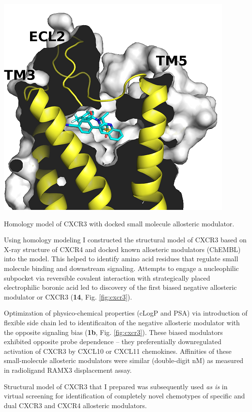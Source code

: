\documentclass{tufte-handout}
\begin{document}
\begin{marginfigure}\label{fig:cxcrHM}
	\includegraphics{cxcr3hpp_small.png}
	\caption{Homology model of CXCR3 with docked small molecule allosteric modulator.}
\end{marginfigure}
 Using homology modeling 
I constructed the structural model of CXCR3 based on X-ray structure of CXCR4 and
docked known allosteric modulators (ChEMBL) into the model. This helped to identify amino acid 
residues that regulate small molecule binding and downstream signaling. Attempts to engage 
a nucleophilic subpocket via reversible covalent interaction with strategically placed electrophilic boronic acid led
to discovery of the first biased negative allosteric modulator or CXCR3 (\textbf{14}, Fig. \ref{fig:cxcr3}).\cite{Bernat2014} 

Optimization of physico-chemical properties (cLogP and PSA) via introduction of flexible side
chain led to identificaiton of the negative allosteric modulator 
with the opposite signaling bias (\textbf{1b}, Fig. \ref{fig:cxcr3}). 
These biased modulators exhibited opposite probe dependence -- they preferentially
downregulated activation of CXCR3 by CXCL10 or CXCL11 chemokines.\cite{Bernat2015a} 
Affinities of these small-molecule allosteric modulators were similar (double-digit nM) as 
measured in radioligand RAMX3 displacement assay.\cite{Bernat2012}


Structural model of CXCR3 that I prepared was subsequently used \textit{as is} in virtual screening for identification
of completely novel chemotypes of specific and dual CXCR3 and CXCR4 allosteric modulators.\cite{Schmidt2015}
\end{document}
